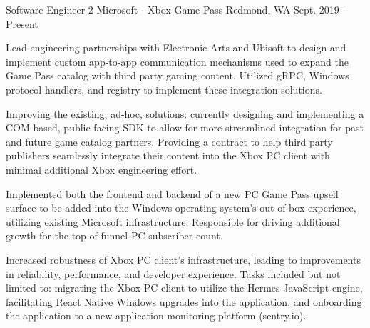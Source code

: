 

\begin{cventries}

  \cventry
    {Software Engineer 2} %
    {Microsoft - Xbox Game Pass} %
    {Redmond, WA} %
    {Sept. 2019 - Present} %
    {
      \begin{cvitems} %
        \item {Lead engineering partnerships with Electronic Arts and Ubisoft to design and implement custom app-to-app communication mechanisms used to expand the Game Pass catalog with third party gaming content. Utilized gRPC, Windows protocol handlers, and registry to implement these integration solutions.} 
          \item{Improving the existing, ad-hoc, solutions: currently designing and implementing a COM-based, public-facing SDK to allow for more streamlined integration for past and future game catalog partners. Providing a contract to help third party publishers seamlessly integrate their content into the Xbox PC client with minimal additional Xbox engineering effort.}
          \item {Implemented both the frontend and backend of a new PC Game Pass upsell surface to be added into the Windows operating system's out-of-box experience, utilizing existing Microsoft infrastructure. Responsible for driving additional growth for the top-of-funnel PC subscriber count.} 
          \item{Increased robustness of Xbox PC client's infrastructure, leading to improvements in reliability, performance, and developer experience. Tasks included but not limited to: migrating the Xbox PC client to utilize the Hermes JavaScript engine, facilitating React Native Windows upgrades into the application, and onboarding the application to a new application monitoring platform (sentry.io).}
      \end{cvitems}
    }


\end{cventries}
